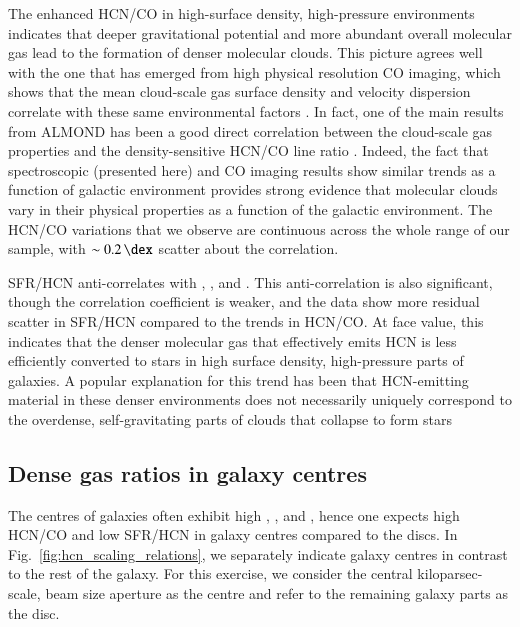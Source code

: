 \documentclass[letter, longauth]{aa} %
\begin{document}
The enhanced HCN/CO in high-surface density, high-pressure environments indicates that deeper gravitational potential and more abundant overall molecular gas lead to the formation of denser molecular clouds. 
This picture agrees well with the one that has emerged from high physical resolution CO imaging, which shows that the mean cloud-scale gas surface density and velocity dispersion correlate with these same environmental factors \citep[][]{Sun2022}. 
In fact, one of the main results from ALMOND has been a good direct correlation between the cloud-scale gas properties and the density-sensitive HCN/CO line ratio \citep{Neumann2023a}. 
Indeed, the fact that spectroscopic (presented here) and CO imaging results show similar trends as a function of galactic environment provides strong evidence that molecular clouds vary in their physical properties as a function of the galactic environment. 
The HCN/CO variations that we observe are continuous across the whole range of our sample, with $\sim\SI{0.2}{\dex}$ scatter about the correlation.

SFR/HCN anti-correlates with \sigstar, \sigmol, and \pde. 
This anti-correlation is also significant, though the correlation coefficient is weaker, and the data show more residual scatter in SFR/HCN compared to the trends in HCN/CO. 
At face value, this indicates that the denser molecular gas that effectively emits HCN is less efficiently converted to stars in high surface density, high-pressure parts of galaxies. 
A popular explanation for this trend has been that HCN-emitting material in these denser environments does not necessarily uniquely correspond to the overdense, self-gravitating parts of clouds that collapse to form stars \citep[e.g.][]{Krumholz2007, Shetty2014, Gallagher2018b, Neumann2023a, Bemis2023, Bemis2024}

\subsection{Dense gas ratios in galaxy centres}
\label{sec:centres}

The centres of galaxies often exhibit high \sigmol, \sigstar, and \pde, hence one expects high HCN/CO and low SFR/HCN in galaxy centres compared to the discs. 
In Fig.~\ref{fig:hcn_scaling_relations}, we separately indicate galaxy centres in contrast to the rest of the galaxy.
For this exercise, we consider the central kiloparsec-scale, beam size aperture as the centre and refer to the remaining galaxy parts as the disc.
\end{document}
